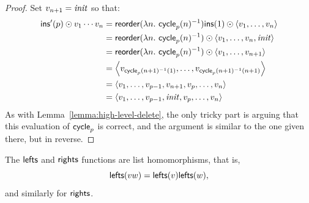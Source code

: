 \begin{proof} Set $v_{n+1}=\mathit{init}$ so that:
\begin{align*}
    \mathsf{ins}'(p) \odot v_1 \cdots v_n
        &= \mathsf{reorder}(\lambda n.\ \mathsf{cycle}_p(n)^{-1})\mathsf{ins}(1) \odot \left< v_1 ,\ldots, v_n \right> \\
        &= \mathsf{reorder}(\lambda n.\ \mathsf{cycle}_p(n)^{-1}) \odot \left< v_1 ,\ldots, v_n,\mathit{init}\right> \\
        &= \mathsf{reorder}(\lambda n.\ \mathsf{cycle}_p(n)^{-1}) \odot \left< v_1 ,\ldots, v_{n+1} \right> \\
        &= \left< v_{\mathsf{cycle}_p(n+1)^{-1}(1)} ,\ldots, v_{\mathsf{cycle}_p(n+1)^{-1}(n+1)} \right> \\
        &= \left< v_1 ,\ldots, v_{p-1} , v_{n+1} , v_p ,\ldots, v_n \right> \\
        &= \left< v_1 ,\ldots, v_{p-1} , \mathit{init} , v_p ,\ldots, v_n \right>
\end{align*}
As with Lemma~\ref{lemma:high-level-delete}, the only tricky part is arguing
that this evaluation of $\mathsf{cycle}_p$ is correct, and the argument is
similar to the one given there, but in reverse.
\end{proof}

\begin{lemma}
\label{lemma:lefts-rights-homomorphism}
The $\mathsf{lefts}$ and $\mathsf{rights}$ functions are list homomorphisms, that
is,
\[\mathsf{lefts}(vw)=\mathsf{lefts}(v)\mathsf{lefts}(w),\]
and similarly for $\mathsf{rights}$.
\end{lemma}

